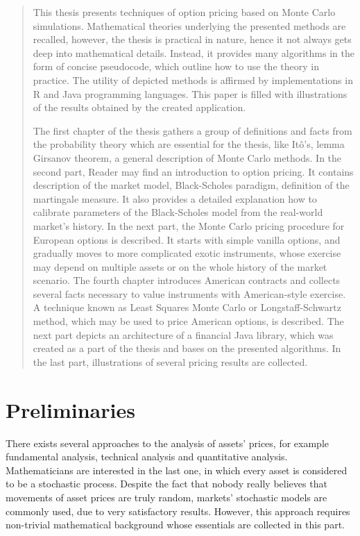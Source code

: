 \documentclass[a4paper,11pt, twoside]{book}
\theoremstyle{definition}
\theoremstyle{remark}
\newcounter{example}[chapter]
\begin{document}
\begin{quotation}
\noindent
  This thesis presents techniques of option pricing based on Monte Carlo simulations. Mathematical theories underlying the presented methods are recalled, however, the thesis is practical in nature, hence it not always gets deep into mathematical details.
  Instead, it provides many algorithms in the form of concise pseudocode, which outline how to use the theory in practice. The utility of depicted methods is affirmed by implementations in R and Java programming languages. This paper is filled with illustrations of the results obtained by the created application.
  
  The first chapter of the thesis gathers a group of definitions and facts from the probability theory which are essential for the thesis, like It\^{o}'s, lemma Girsanov theorem, a general description of Monte Carlo methods.
  In the second part, Reader may find an introduction to option pricing. It contains description of the market model, Black-Scholes paradigm, definition of the martingale measure. It also provides a detailed explanation how to calibrate parameters of the Black-Scholes model from the real-world market's history.
  In the next part, the Monte Carlo pricing procedure for European options is described. It starts with simple vanilla options, and gradually moves to more complicated exotic instruments, whose exercise may depend on multiple assets or on the whole history of the market scenario. 
  The fourth chapter introduces American contracts and collects several facts necessary to value instruments with American-style exercise. A technique known as Least Squares Monte Carlo or Longstaff-Schwartz method, which may be used to price American options, is described.
  The next part depicts an architecture of a financial Java library, which was created as a part of the thesis and bases on the presented algorithms.
  In the last part, illustrations of several pricing results are collected.
\end{quotation}

\chapter{Preliminaries}
There exists several approaches to the analysis of assets' prices, for example fundamental analysis, technical analysis and quantitative analysis. Mathematicians are interested in the last one, in which every asset is considered to be a stochastic process.
Despite the fact that nobody really believes that movements of asset prices are truly random, markets' stochastic models are commonly used, due to very satisfactory results. However, this approach requires non-trivial mathematical background whose essentials are collected in this part.
\end{document}
